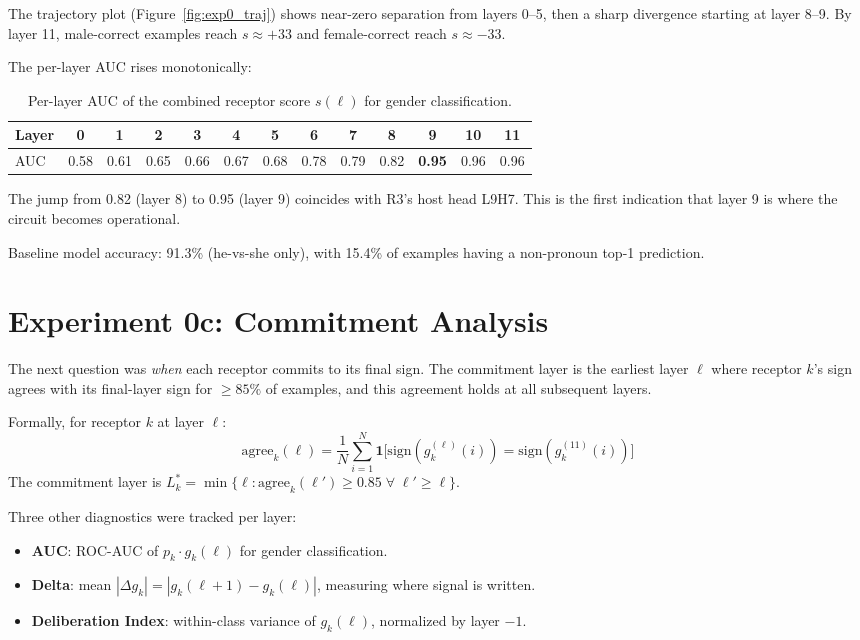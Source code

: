 \documentclass[11pt,a4paper]{article}
\begin{document}
The trajectory plot (Figure~\ref{fig:exp0_traj}) shows near-zero separation from layers 0--5, then a sharp divergence starting at layer 8--9. By layer 11, male-correct examples reach $s \approx +33$ and female-correct reach $s \approx -33$.

The per-layer AUC rises monotonically:

\begin{table}[H]
\centering
\small
\begin{tabular}{lcccccccccccc}
\toprule
Layer & 0 & 1 & 2 & 3 & 4 & 5 & 6 & 7 & 8 & 9 & 10 & 11 \\
\midrule
AUC & 0.58 & 0.61 & 0.65 & 0.66 & 0.67 & 0.68 & 0.78 & 0.79 & 0.82 & \textbf{0.95} & 0.96 & 0.96 \\
\bottomrule
\end{tabular}
\caption{Per-layer AUC of the combined receptor score $s(\ell)$ for gender classification.}
\label{tab:exp0_auc}
\end{table}

The jump from 0.82 (layer 8) to 0.95 (layer 9) coincides with R3's host head L9H7. This is the first indication that layer 9 is where the circuit becomes operational.

Baseline model accuracy: 91.3\% (he-vs-she only), with 15.4\% of examples having a non-pronoun top-1 prediction.


\section{Experiment 0c: Commitment Analysis}
\label{sec:exp0c}

The next question was \emph{when} each receptor commits to its final sign. The commitment layer is the earliest layer $\ell$ where receptor $k$'s sign agrees with its final-layer sign for $\geq 85\%$ of examples, and this agreement holds at all subsequent layers.

Formally, for receptor $k$ at layer $\ell$:
\begin{equation}
\text{agree}_k(\ell) = \frac{1}{N}\sum_{i=1}^{N} \mathbf{1}\big[\text{sign}(g_k^{(\ell)}(i)) = \text{sign}(g_k^{(11)}(i))\big]
\end{equation}
The commitment layer is $L_k^* = \min\{\ell : \text{agree}_k(\ell') \geq 0.85 \;\forall\; \ell' \geq \ell\}$.

Three other diagnostics were tracked per layer:
\begin{itemize}[nosep]
\item \textbf{AUC}: ROC-AUC of $p_k \cdot g_k(\ell)$ for gender classification.
\item \textbf{Delta}: mean $|\Delta g_k| = |g_k(\ell+1) - g_k(\ell)|$, measuring where signal is written.
\item \textbf{Deliberation Index}: within-class variance of $g_k(\ell)$, normalized by layer $-1$.
\end{itemize}
\end{document}
